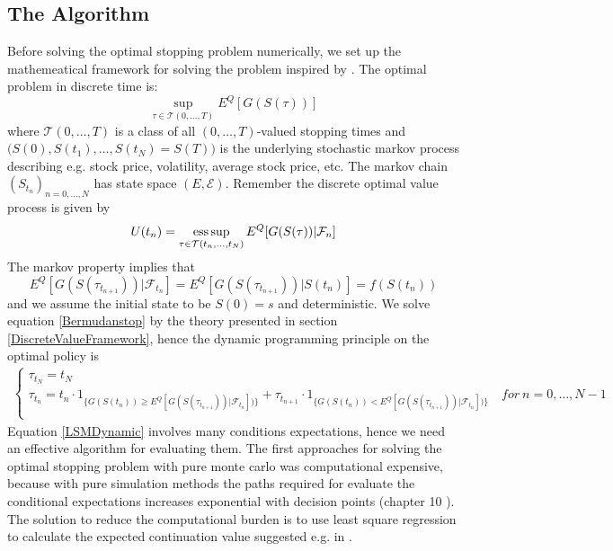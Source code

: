 \subsection{The Algorithm}
Before solving the optimal stopping problem numerically, we set up the mathemeatical framework for solving the problem inspired by \parencite{analysislsm}. The optimal problem in discrete time is:
\begin{equation}\label{Bermudanstop}
\sup_{\tau \in \mathcal{T}(0,\ldots,T)} E^Q[G(S(\tau))]
\end{equation}
where $\mathcal{T}(0,\ldots,T)$ is a class of all $(0,\ldots,T)$-valued stopping times and $\bigg(S(0),S(t_1), \ldots, S(t_N)=S(T)\bigg)$ is the underlying stochastic markov process describing e.g. stock price, volatility, average stock price, etc. The markov chain $(S_{t_n})_{n=0,\ldots,N}$ has state space $(E, \mathcal{E})$. Remember the discrete optimal value process is given by
$$U(t_n)=\operatorname*{ess\,sup}_{\tau \in \mathcal{T}(t_n,\ldots,t_N)} E^Q[G(S(\tau))|\mathcal{F}_n]$$
The markov property implies that 
$$E^Q[G(S(\tau_{t_{n+1}}))|\mathcal{F}_{t_n}]=E^Q[G(S(\tau_{t_{n+1}}))|S(t_n)]=f(S(t_n))$$ 
and we assume the initial state to be $S(0)=s$ and deterministic. We solve equation \eqref{Bermudanstop} by the theory presented in section \ref{DiscreteValueFramework}, hence the dynamic programming principle on the optimal policy is
\begin{equation}\label{LSMDynamic}
\begin{split}
\begin{cases}
          \tau_{t_N} = t_N\\
          \tau_{t_n} = t_n \cdot 1_{\{G(S(t_n)) \geq E^Q[G(S(\tau_{t_{n+1}}))|\mathcal{F}_{t_n}])\}} + \tau_{t_{n+1}} \cdot 1_{\{G(S(t_n)) < E^Q[G(S(\tau_{t_{n+1}}))|\mathcal{F}_{t_n}])\}} \quad for \ n={0,\ldots,N-1} \\ 
\end{cases}
\end{split}
\end{equation}
Equation \eqref{LSMDynamic} involves many conditions expectations, hence we need an effective algorithm for evaluating them. The first approaches for solving the optimal stopping problem with pure monte carlo was computational expensive, because with pure simulation methods the paths required for evaluate the conditional expectations increases exponential with decision points (chapter 10 \parencite{OVERHAUSMARCUS2007EHD}). The solution to reduce the computational burden is to use least square regression to calculate the expected continuation value suggested e.g. in \parencite{lsm,Tsitsiklis}. \\


